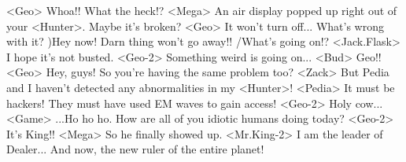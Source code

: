 <Geo> Whoa!! What the heck!? 
<Mega> An air display popped up right out of your <Hunter>. 
Maybe it's broken? 
<Geo> It won't turn off... What's wrong with it? 
)Hey now! Darn thing won't go away!! 
/What's going on!? 
<Jack.Flask> I hope it's not busted. 
<Geo-2> Something weird is going on... 
<Bud> Geo!! 
<Geo> Hey, guys! 
So you're having the same problem too? 
<Zack> But Pedia and I haven't detected any abnormalities in my <Hunter>! 
<Pedia> It must be hackers! 
They must have used EM waves to gain access! 
<Geo-2> Holy cow... 
<Game> ...Ho ho ho. 
How are all of you idiotic humans doing today? 
<Geo-2> It's King!! 
<Mega> So he finally showed up. 
<Mr.King-2> I am the leader of Dealer... 
And now, the new ruler of the entire planet! 
